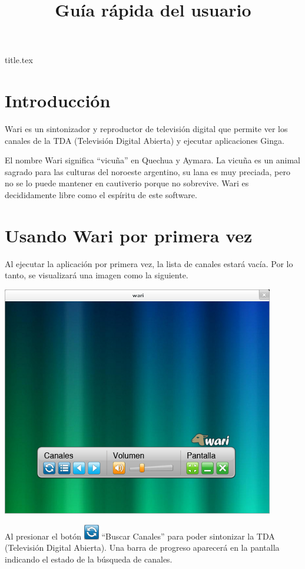 \documentclass{article}
\begin{document}
\title{Guía rápida del usuario}
{title.tex}

\section{Introducción}
Wari es un sintonizador y reproductor de televisión digital que permite ver los canales de la TDA (Televisión Digital Abierta) y ejecutar aplicaciones Ginga.

\vspace{0.5cm}
El nombre Wari significa ``vicuña'' en Quechua y Aymara. La vicuña es un animal sagrado para las culturas del noroeste argentino, su lana es muy preciada, pero no se lo puede mantener en cautiverio porque no sobrevive. Wari es decididamente libre como el espíritu de este software.

\section{Usando Wari por primera vez}

Al ejecutar la aplicación por primera vez, la lista de canales estará vacía. Por lo tanto, se visualizará una imagen como la siguiente.

\vspace{0.5cm}
\centerline{\includegraphics[scale=1,keepaspectratio=true]{inicio}}

\vspace{0.5cm}
Al presionar el botón \includegraphics[scale=0.5,keepaspectratio=true]{BtnCanalesScan} ``Buscar Canales'' para poder sintonizar la TDA (Televisión Digital Abierta). Una barra de progreso aparecerá en la pantalla indicando el estado de la búsqueda de canales.
\end{document}
